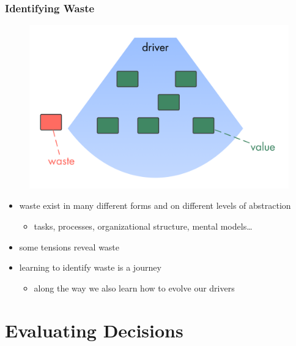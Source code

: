 \subsubsection{Identifying Waste}
\label{identifyingwaste}

\begin{figure}[htbp]
\centering
\includegraphics[keepaspectratio,width=\textwidth,height=0.75\textheight]{img/workflow-and-value/drivers-value-waste.png}
\end{figure}

\begin{itemize}
\item waste exist in many different forms and on different levels of abstraction

\begin{itemize}
\item tasks, processes, organizational structure, mental models{\ldots}

\end{itemize}

\item some tensions reveal waste

\item learning to identify waste is a journey

\begin{itemize}
\item along the way we also learn how to evolve our drivers

\end{itemize}

\end{itemize}

\section{Evaluating Decisions}
\label{evaluatingdecisions}

